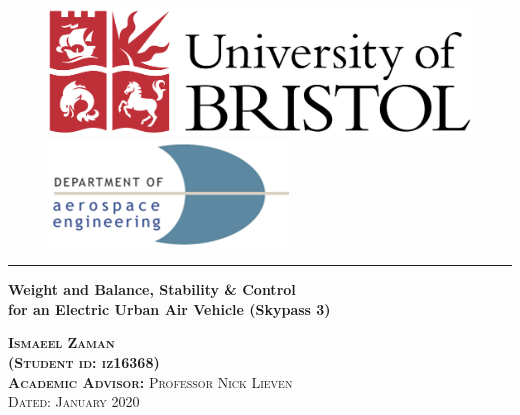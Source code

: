 \documentclass[11pt,a4paper]{article}
\begin{document}
\begin{titlepage}

\begin{figure}[H]
  \includegraphics[width=.75\linewidth]{University_of_Bristol_logo.png}
  \endminipage\hfill
  \centering
    \endminipage\hfill
    \hspace{12mm}
      \includegraphics[width=.75\linewidth]{Aero_logo.png}
      \endminipage
      \end{figure}

\center 
\vspace{20mm}
\hrule

{\Large  \textbf{Weight and Balance, Stability \& Control \\ \vspace{2mm}
for an Electric Urban Air Vehicle (Skypass 3)}}
\vspace{10mm}

\textsc{\textbf{Ismaeel Zaman}} \\
\textsc{\textbf{(Student id: iz16368)}} \\
\vspace{10mm}
\textsc{\textbf{Academic Advisor:} Professor Nick Lieven} 
\\[0.5cm]

\vspace{24pt}
\textsc{\large Dated: January 2020} 
\vspace{6pt}


\end{titlepage}
\end{document}
